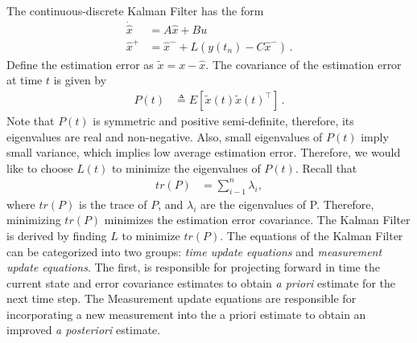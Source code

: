 The continuous-discrete Kalman Filter has the form
\begin{align}
\dot{\hat{x}}&=A\hat{x}+Bu \\
\hat{x}^+&=\hat{x}^-+L(y(t_n)-C\hat{x}^-)\,.
\end{align}
Define the estimation error as \begin{math} \tilde{x}=x-\hat{x} \end{math}. The covariance of the estimation error at time \begin{math} t \end{math} is given by
\begin{align}
P(t)&\triangleq E[\tilde{x}(t)\tilde{x}(t)^\top]\,.
\end{align}
Note that \begin{math} P(t) \end{math} is symmetric and positive semi-definite, therefore, its eigenvalues are real and non-negative. Also, small eigenvalues of \begin{math} P(t) \end{math} imply small variance, which implies low average estimation error. Therefore, we would like to choose \begin{math} L(t) \end{math} to minimize the eigenvalues of \begin{math} P(t) \end{math}. Recall that
\begin{align*}
tr(P)&=\sum_{i-1}^{n}\lambda_i, 
\end{align*}
where \begin{math} tr(P) \end{math} is the trace of \begin{math} P \end{math}, and \begin{math} \lambda_i \end{math} are the eigenvalues of P. Therefore, minimizing \begin{math} tr(P) \end{math} minimizes the estimation error covariance. The Kalman Filter is derived by finding \begin{math} L \end{math} to minimize \begin{math} tr(P) \end{math}.
The equations of the Kalman Filter can be categorized into two groups: \textit{time update equations} and \textit{measurement update equations}. The first, is responsible for projecting forward in time the current state and error covariance estimates to obtain \textit{a priori} estimate for the next time step. The Measurement update equations are responsible for incorporating a new measurement into the a priori estimate to obtain an improved \textit{a posteriori} estimate.

